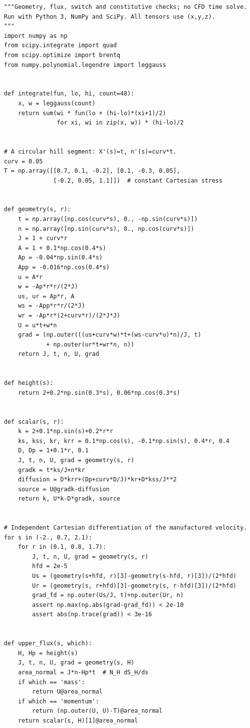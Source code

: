 \documentclass[11pt,a4paper]{article}
\numberwithin{equation}{section}
\begin{document}
\begin{lstlisting}[style=py]
"""Geometry, flux, switch and constitutive checks; no CFD time solve.
Run with Python 3, NumPy and SciPy. All tensors use (x,y,z).
"""
import numpy as np
from scipy.integrate import quad
from scipy.optimize import brentq
from numpy.polynomial.legendre import leggauss


def integrate(fun, lo, hi, count=48):
    x, w = leggauss(count)
    return sum(wi * fun(lo + (hi-lo)*(xi+1)/2)
               for xi, wi in zip(x, w)) * (hi-lo)/2


# A circular hill segment: X'(s)=t, n'(s)=curv*t.
curv = 0.05
T = np.array([[0.7, 0.1, -0.2], [0.1, -0.3, 0.05],
              [-0.2, 0.05, 1.1]])  # constant Cartesian stress


def geometry(s, r):
    t = np.array([np.cos(curv*s), 0., -np.sin(curv*s)])
    n = np.array([np.sin(curv*s), 0., np.cos(curv*s)])
    J = 1 + curv*r
    A = 1 + 0.1*np.cos(0.4*s)
    Ap = -0.04*np.sin(0.4*s)
    App = -0.016*np.cos(0.4*s)
    u = A*r
    w = -Ap*r*r/(2*J)
    us, ur = Ap*r, A
    ws = -App*r*r/(2*J)
    wr = -Ap*r*(2+curv*r)/(2*J*J)
    U = u*t+w*n
    grad = (np.outer(((us+curv*w)*t+(ws-curv*u)*n)/J, t)
            + np.outer(ur*t+wr*n, n))
    return J, t, n, U, grad


def height(s):
    return 2+0.2*np.sin(0.3*s), 0.06*np.cos(0.3*s)


def scalar(s, r):
    k = 2+0.1*np.sin(s)+0.2*r*r
    ks, kss, kr, krr = 0.1*np.cos(s), -0.1*np.sin(s), 0.4*r, 0.4
    D, Dp = 1+0.1*r, 0.1
    J, t, n, U, grad = geometry(s, r)
    gradk = t*ks/J+n*kr
    diffusion = D*krr+(Dp+curv*D/J)*kr+D*kss/J**2
    source = U@gradk-diffusion
    return k, U*k-D*gradk, source


# Independent Cartesian differentiation of the manufactured velocity.
for s in (-2., 0.7, 2.1):
    for r in (0.1, 0.8, 1.7):
        J, t, n, U, grad = geometry(s, r)
        hfd = 2e-5
        Us = (geometry(s+hfd, r)[3]-geometry(s-hfd, r)[3])/(2*hfd)
        Ur = (geometry(s, r+hfd)[3]-geometry(s, r-hfd)[3])/(2*hfd)
        grad_fd = np.outer(Us/J, t)+np.outer(Ur, n)
        assert np.max(np.abs(grad-grad_fd)) < 2e-10
        assert abs(np.trace(grad)) < 3e-16


def upper_flux(s, which):
    H, Hp = height(s)
    J, t, n, U, grad = geometry(s, H)
    area_normal = J*n-Hp*t  # N_H dS_H/ds
    if which == 'mass':
        return U@area_normal
    if which == 'momentum':
        return (np.outer(U, U)-T)@area_normal
    return scalar(s, H)[1]@area_normal



\end{lstlisting}
\end{document}
